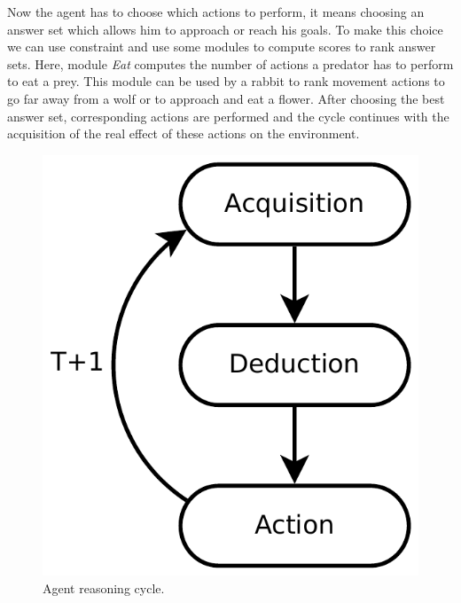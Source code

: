 \documentclass{aamas2012}
\begin{document}
	Now the agent has to choose which actions to perform, it means choosing an answer set which allows him to approach or reach his goals.
	To make this choice we can use constraint and use some modules to compute scores to rank answer sets.
	Here, module \emph{Eat} computes the number of actions a predator has to perform to eat a prey.
	This module can be used by a rabbit to rank movement actions to go far away from a wolf or to approach and eat a flower.
	After choosing the best answer set, corresponding actions are performed and 
	the cycle continues with the acquisition of the real effect of these actions on the environment.

	\begin{figure}
		\centering
		\includegraphics[keepaspectratio=true, scale=0.4]{framework.pdf}
		\caption
		{
			\label{framework_figure}
			Agent reasoning cycle.
		}
	\end{figure}
\end{document}
